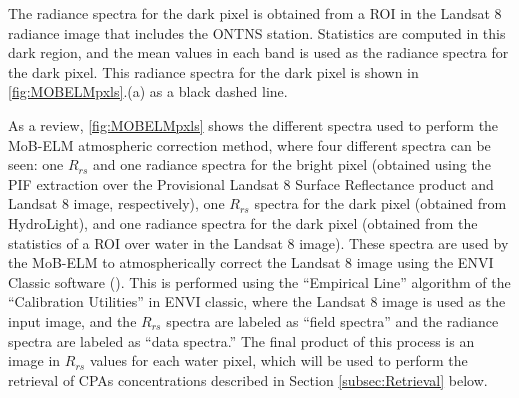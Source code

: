 \documentclass[onecolumn,3p,letterpaper]{elsarticle}
\begin{document}

The radiance spectra for the dark pixel is obtained from a ROI in the Landsat 8 radiance image that includes the ONTNS station. Statistics are computed in this dark region, and the mean values in each band is used as the radiance spectra for the dark pixel. This radiance spectra for the dark pixel is shown in \autoref{fig:MOBELMpxls}.(a) as a black dashed line.

As a review, \autoref{fig:MOBELMpxls} shows the different spectra used to perform the MoB-ELM atmospheric correction method, where four different spectra can be seen: one $R_{rs}$ and one radiance spectra for the bright pixel (obtained using the PIF extraction over the Provisional Landsat 8 Surface Reflectance product and Landsat 8 image, respectively), one $R_{rs}$ spectra for the dark pixel (obtained from HydroLight), and one radiance spectra for the dark pixel (obtained from the statistics of a ROI over water in the Landsat 8 image). These spectra are used by the MoB-ELM to atmospherically correct the Landsat 8 image using the ENVI Classic software (\cite{ENVIUserGuide}). This is performed using the ``Empirical Line'' algorithm of the ``Calibration Utilities'' in ENVI classic, where the Landsat 8 image is used as the input image, and the $R_{rs}$ spectra are labeled as ``field spectra'' and the radiance spectra are labeled as ``data spectra.'' The final product of this process is an image in $R_{rs}$ values for each water pixel, which will be used to perform the retrieval of CPAs concentrations described in Section \ref{subsec:Retrieval} below. 

\end{document}
